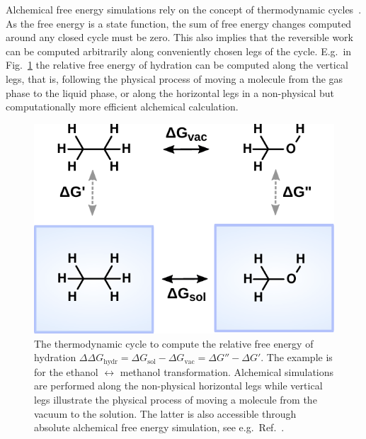 \documentclass[journal=jctcce,manuscript=article]{achemso}
\begin{document}
Alchemical free energy simulations rely on the concept of thermodynamic 
cycles~\cite{Tembe1984281}.
As the free energy is a state function, the sum of free energy changes
computed around any closed cycle must be zero.  This also implies
that the reversible work can be computed arbitrarily along
conveniently chosen legs of the cycle.  E.g.\ in
Fig.~\ref{fig:thermocycle} the relative free energy of hydration can
be computed along the vertical legs, that is, following the physical
process of moving a molecule from the gas phase to the liquid phase,
or along the horizontal legs in a non-physical but computationally more
efficient alchemical calculation.

\begin{figure}[ht]
  \includegraphics[scale=1.0]{figures/thermocycle.pdf}
  \caption{The thermodynamic cycle to compute the relative free energy
    of hydration
    $\Delta\Delta G_{\mathrm{hydr}}=\Delta G_{\mathrm{sol}}-\Delta
    G_{\mathrm{vac}}=\Delta G'' - \Delta G'$.  The example is for the
    ethanol $\leftrightarrow$ methanol transformation.  Alchemical
    simulations are performed along the non-physical horizontal
    legs while vertical legs illustrate the physical process of moving a 
    molecule from the vacuum to the solution.  The latter is also accessible 
    through absolute alchemical free energy simulation, see e.g.\ 
    Ref.~.}
  \label{fig:thermocycle}
\end{figure}
\end{document}
